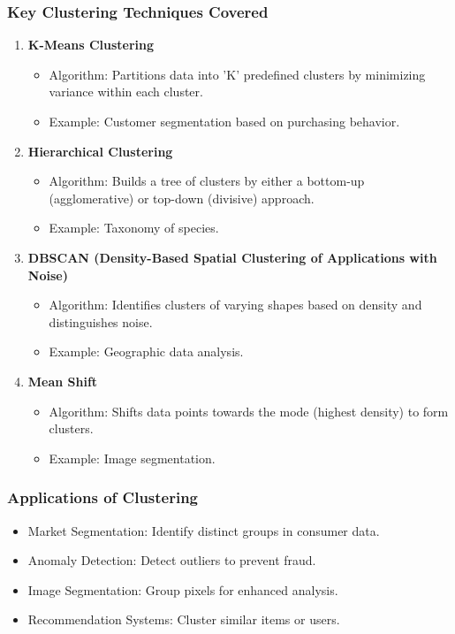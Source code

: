 \documentclass[aspectratio=169]{beamer}
\begin{document}
\begin{frame}
  \frametitle{Key Clustering Techniques Covered}
  \begin{enumerate}
    \item \textbf{K-Means Clustering}
      \begin{itemize}
        \item Algorithm: Partitions data into 'K' predefined clusters by minimizing variance within each cluster.
        \item Example: Customer segmentation based on purchasing behavior.
      \end{itemize}

    \item \textbf{Hierarchical Clustering}
      \begin{itemize}
        \item Algorithm: Builds a tree of clusters by either a bottom-up (agglomerative) or top-down (divisive) approach.
        \item Example: Taxonomy of species.
      \end{itemize}
      
    \item \textbf{DBSCAN (Density-Based Spatial Clustering of Applications with Noise)}
      \begin{itemize}
        \item Algorithm: Identifies clusters of varying shapes based on density and distinguishes noise.
        \item Example: Geographic data analysis.
      \end{itemize}
      
    \item \textbf{Mean Shift}
      \begin{itemize}
        \item Algorithm: Shifts data points towards the mode (highest density) to form clusters.
        \item Example: Image segmentation.
      \end{itemize}
  \end{enumerate}
\end{frame}

\begin{frame}[fragile]
  \frametitle{Applications of Clustering}
  \begin{itemize}
    \item Market Segmentation: Identify distinct groups in consumer data.
    \item Anomaly Detection: Detect outliers to prevent fraud.
    \item Image Segmentation: Group pixels for enhanced analysis.
    \item Recommendation Systems: Cluster similar items or users.
  \end{itemize}
\end{frame}
\end{document}
